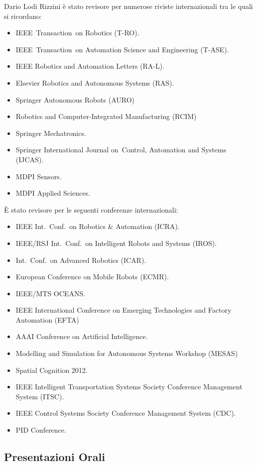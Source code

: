 \documentclass[11pt]{article}
\begin{document}
Dario Lodi Rizzini \`e stato revisore per numerose riviste internazionali tra le quali si ricordano:
\begin{itemize}
\item IEEE~Transaction~on Robotics (T-RO).
\item IEEE~Transaction~on Automation Science and Engineering (T-ASE).
\item IEEE Robotics and Automation Letters (RA-L). 
\item Elsevier Robotics and Autonomous Systems (RAS).
\item Springer Autonomous Robots (AURO)
\item Robotics and Computer-Integrated Manufacturing (RCIM)
\item Springer Mechatronics.
\item Springer International Journal on~Control, Automation and Systems (IJCAS).
\item MDPI Sensors. 
\item MDPI Applied Sciences. 
\end{itemize}

\noindent \`E stato revisore per le seguenti conferenze internazionali:
\begin{itemize}
\item IEEE Int.~Conf.~on Robotics \& Automation (ICRA).
\item IEEE/RSJ Int.~Conf.~on Intelligent Robots and Systems (IROS).
\item Int.~Conf.~on Advanced Robotics (ICAR).
\item European Conference on Mobile Robots (ECMR). 
\item IEEE/MTS OCEANS. 
\item IEEE International Conference on Emerging Technologies and Factory Automation (EFTA)
\item AAAI Conference on Artificial Intelligence. 
\item Modelling and Simulation for Autonomous Systems Workshop (MESAS)
\item Spatial Cognition 2012.
\item IEEE Intelligent Transportation Systems Society Conference Management System (ITSC).
\item IEEE Control Systems Society Conference Management System (CDC).
\item PID Conference.
\end{itemize}

\subsection*{Presentazioni Orali}
\end{document}
